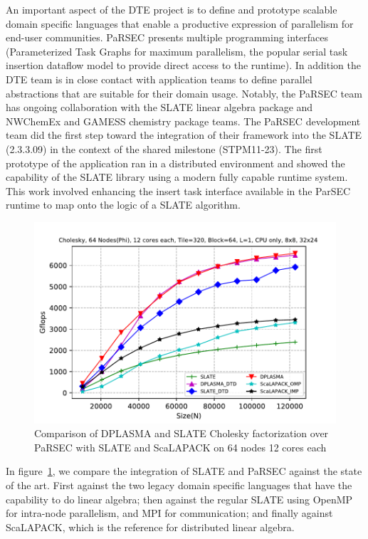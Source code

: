 An important aspect of the DTE project is to define and prototype scalable
domain specific languages that enable a productive expression of parallelism for
end-user communities. PaRSEC presents multiple programming interfaces
(Parameterized Task Graphs for maximum parallelism, the popular serial task
insertion dataflow model to provide direct access to the runtime). In addition
the DTE team is in close contact with application teams to define parallel
abstractions that are suitable for their domain usage. Notably, the PaRSEC team
has ongoing collaboration with the SLATE linear algebra package and NWChemEx and
GAMESS chemistry package teams. The PaRSEC development team did the first step
toward the integration of their framework into the SLATE (2.3.3.09) in the
context of the shared milestone (STPM11-23). The first prototype of the
application ran in a distributed environment and showed the capability of the
SLATE library using a modern fully capable runtime system. This work involved
enhancing the insert task interface available in the ParSEC runtime to map onto
the logic of a SLATE algorithm.

\begin{figure}
  \vspace*{-1em}\centering\includegraphics[scale=0.55]{projects/2.3.1-PMR/2.3.1.09-ParSEC/SLATE_inital_result_phicluster_scalapack.pdf}
  \caption{Comparison of DPLASMA and SLATE Cholesky factorization over PaRSEC with
           SLATE and ScaLAPACK on 64 nodes 12 cores each\label{fig:slate-parsec}}
\end{figure}
%
In figure~\ref{fig:slate-parsec}, we compare the integration of SLATE
and PaRSEC against the state of the art. First against the two legacy
domain specific languages that have the capability to do linear
algebra; then against the regular SLATE using OpenMP for intra-node
parallelism, and MPI for communication; and finally against ScaLAPACK,
which is the reference for distributed linear algebra.


